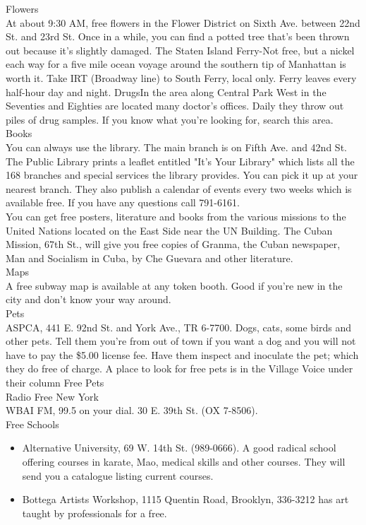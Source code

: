 \documentclass[11pt,twoside,a4paper]{book}
\begin{document}
Flowers~\\
At about 9:30 AM, free flowers in the Flower District on Sixth Ave. between 22nd St. and 23rd St. Once in a while, you can find a potted tree that's been thrown out because it's slightly damaged. The Staten Island Ferry-Not free, but a nickel each way for a five mile ocean voyage around the southern tip of Manhattan is worth it. Take IRT (Broadway line) to South Ferry, local only. Ferry leaves every half-hour day and night. DrugsIn the area along Central Park West in the Seventies and Eighties are located many doctor's offices. Daily they throw out piles of drug samples. If you know what you're looking for, search this area.~\\

Books~\\
You can always use the library. The main branch is on Fifth Ave. and 42nd St. The Public Library prints a leaflet entitled "It's Your Library" which lists all the 168 branches and special services the library provides. You can pick it up at your nearest branch. They also publish a calendar of events every two weeks which is available free. If you have any questions call 791-6161.~\\

You can get free posters, literature and books from the various missions to the United Nations located on the East Side near the UN Building. The Cuban Mission, 67th St., will give you free copies of Granma, the Cuban newspaper, Man and Socialism in Cuba, by Che Guevara and other literature.~\\

Maps~\\
A free subway map is available at any token booth. Good if you're new in the city and don't know your way around.~\\

Pets~\\
ASPCA, 441 E. 92nd St. and York Ave., TR 6-7700. Dogs, cats, some birds and other pets. Tell them you're from out of town if you want a dog and you will not have to pay the \$5.00 license fee. Have them inspect and inoculate the pet; which they do free of charge. A place to look for free pets is in the Village Voice under their column Free Pets~\\

Radio Free New York~\\
WBAI FM, 99.5 on your dial. 30 E. 39th St. (OX 7-8506).~\\

Free Schools~\\
\begin{itemize}
\item Alternative University, 69 W. 14th St. (989-0666). A good radical school offering courses in karate, Mao, medical skills and other courses. They will send you a catalogue listing current courses. 
\item Bottega Artists Workshop, 1115 Quentin Road, Brooklyn, 336-3212 has art taught by professionals for a free.
\end{itemize}
\end{document}
